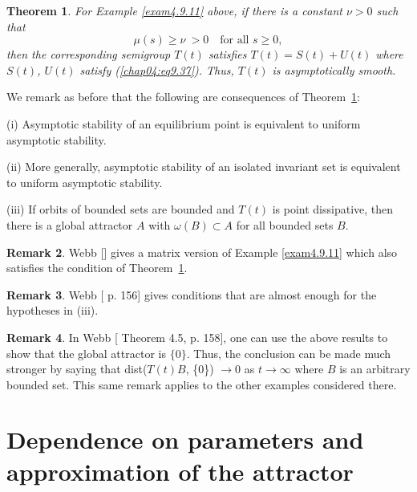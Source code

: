 \documentclass{surv-l}
\theoremstyle{plain}
\newtheorem{theorem}{Theorem}[section]
\theoremstyle{definition}
\newtheorem{remark}[theorem]{Remark}
\numberwithin{equation}{section}
\numberwithin{figure}{chapter}
\begin{document}
\begin{theorem}\label{thm4.9.12} For Example \emph{\ref{exam4.9.11}} above, if there is a constant $\nu >0$ such that
\begin{equation}\label{chap04:eq9.42}
\mu(s)\geq\nu\ >0\quad \text{for all } s\geq 0,
\end{equation}
then the corresponding semigroup $T(t)$ satisfies $T(t)=S(t)+U(t)$ where $S(t)$, $U(t)$ satisfy \emph{(\ref{chap04:eq9.37})}. Thus, $T(t)$ is asymptotically smooth.
\end{theorem}

We remark as before that the following are consequences of Theorem~\ref{thm4.9.12}:

(i) Asymptotic stability of an equilibrium point is equivalent to uniform asymptotic stability.

(ii) More generally, asymptotic stability of an isolated invariant set is equivalent to uniform asymptotic stability.

(iii) If orbits of bounded sets are bounded and $T(t)$ is point dissipative, then there is a global attractor $A$ with $\omega(B)\subset A$ for all bounded sets $B$.

\begin{remark}\label{rem4.9.13} Webb [\citeyear{1985w}] gives a matrix version of Example \ref{exam4.9.11} which also satisfies the condition of Theorem~\ref{thm4.9.12}.
\end{remark}

\begin{remark}\label{rem4.9.14} Webb [\citeyear{1985w} p. 156] gives conditions that are almost enough for the hypotheses in (iii).
\end{remark}

\begin{remark}\label{rem4.9.15} In Webb [\citeyear{1985w} Theorem 4.5, p. 158], one can use the above results to show that the global attractor is $\{0\}$. Thus, the conclusion can be made much stronger by saying that dist($T(t)B$, \{0\}) $\rightarrow 0$ as $ t\rightarrow\infty$ where $B$ is an arbitrary bounded set. This same remark applies to the other examples considered there.
\end{remark}

\section{Dependence on parameters and approximation of the attractor}\label{sec4.10}
\end{document}
